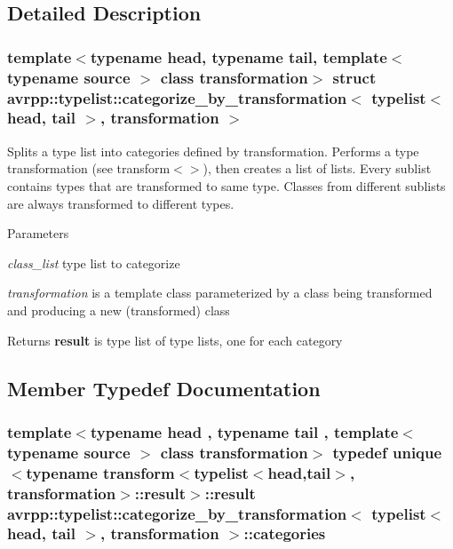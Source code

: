 \subsection{Detailed Description}
\subsubsection*{template$<$typename head, typename tail, template$<$ typename source $>$ class transformation$>$ struct avrpp::typelist::categorize\_\-by\_\-transformation$<$ typelist$<$ head, tail $>$, transformation $>$}

Splits a type list into categories defined by transformation. Performs a type transformation (see transform$<$$>$), then creates a list of lists. Every sublist contains types that are transformed to same type. Classes from different sublists are always transformed to different types.


\begin{DoxyParams}{Parameters}
\item[{\em class\_\-list}]type list to categorize \item[{\em transformation}]is a template class parameterized by a class being transformed and producing a new (transformed) class \end{DoxyParams}
\begin{DoxyReturn}{Returns}
{\bfseries result} is type list of type lists, one for each category 
\end{DoxyReturn}


\subsection{Member Typedef Documentation}
\hypertarget{structavrpp_1_1typelist_1_1categorize__by__transformation_3_01typelist_3_01head_00_01tail_01_4_00_01transformation_01_4_a545354e092df4e93defb6ef27e514086}{
\subsubsection[{categories}]{\setlength{\rightskip}{0pt plus 5cm}template$<$typename head , typename tail , template$<$ typename source $>$ class transformation$>$ typedef {\bf unique}$<$typename transform$<${\bf typelist}$<$head,tail$>$, transformation$>$::{\bf result}$>$::{\bf result} avrpp::typelist::categorize\_\-by\_\-transformation$<$ {\bf typelist}$<$ head, tail $>$, transformation $>$::{\bf categories}}}
\label{structavrpp_1_1typelist_1_1categorize__by__transformation_3_01typelist_3_01head_00_01tail_01_4_00_01transformation_01_4_a545354e092df4e93defb6ef27e514086}



